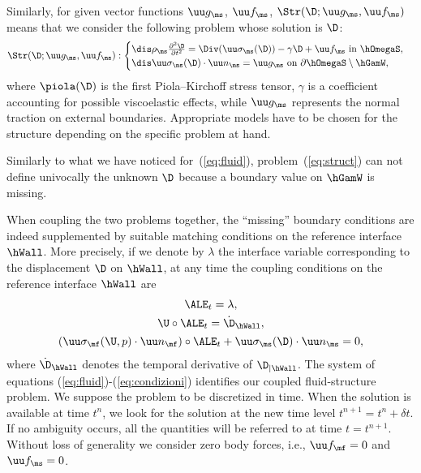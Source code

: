 Similarly, for given vector functions $\uu g_\ms$, $\uu f_\ms$, $\Str(\D;\uu g_\ms, \uu f_\ms)$ means that
we consider the following problem whose solution is $\D$:
\begin{equation}\label{eq:struct}
  \Str(\D;\uu g_\ms, \uu f_\ms) :
  \begin{cases}
    \dis  \rho_\ms \frac{\partial^2 \D}{\partial t^2} = \Div(\uu \sigma_\ms(\D))
    -\gamma \D +\uu f_\ms \text{ in }\hOmegaS, \\
    \dis  \uu\sigma_\ms(\D) \cdot {\uu n}_\ms = \uu g_\ms
    \text{ on }\partial\hOmegaS\setminus\hGamW,
  \end{cases}
\end{equation}
where $\piola(\D)$ is the first Piola--Kirchoff stress tensor,
$\gamma$ is a coefficient accounting for possible viscoelastic
effects, while $\uu g_\ms$ represents the normal traction on
external boundaries. Appropriate models have to be chosen for the
structure depending on the specific problem at hand.

Similarly to what we have noticed for~(\ref{eq:fluid}),
problem~(\ref{eq:struct}) can not define univocally the unknown
$\D$ because a boundary value on $\hGamW$ is missing.

When coupling the two problems together, the ``missing'' boundary
conditions are indeed supplemented by suitable matching
conditions on the reference interface $\hWall$. More precisely,
if we denote by $\lambda$ the interface variable corresponding to
the displacement $\D$ on $\hWall$, at any time the coupling
conditions on the reference interface $\hWall$ are
\begin{equation}\label{eq:condizioni}
\begin{array}{c}
  \ALE_{t} = \lambda ,\\[4pt]
  \U \circ \ALE_t = \dot{\D}_{\hWall} ,\\[4pt]
  (\uu \sigma_\mf(\U,p) \cdot {\uu n}_\mf) \circ \ALE_t +
  \uu \sigma_\ms(\D)\cdot {\uu n}_\ms =0,
\end{array}
\end{equation}
where $\dot{\D}_{\hWall}$ denotes the temporal derivative of
$\D_{\vert\hWall}$. The system of equations (\ref{eq:fluid})-(\ref{eq:condizioni})
identifies our coupled fluid-structure problem.
We suppose the problem to be discretized in time. When the
solution is available at time $t^n$, we look for the solution at
the new time level $t^{n+1} = t^n + \delta t$. If no ambiguity
occurs,  all the quantities will be referred to at time
$t=t^{n+1}$.
Without loss of generality we consider zero body forces, i.e.,
$\uu f_\mf =0$ and $\uu f_\ms=0$.


